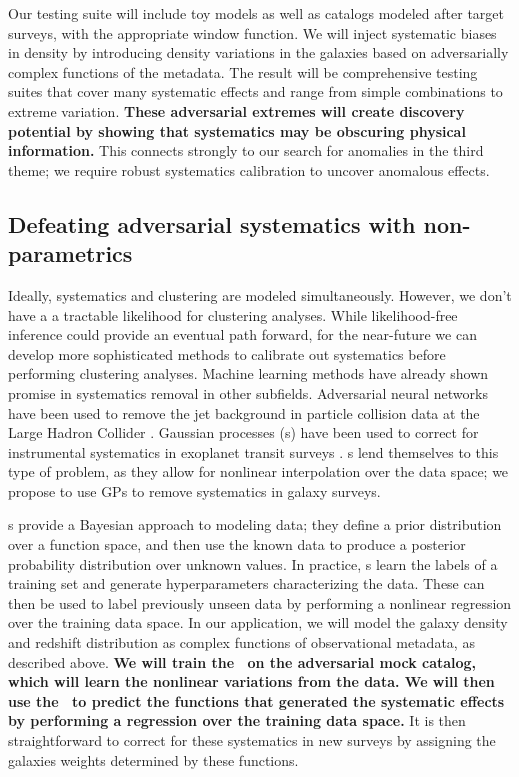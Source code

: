 \documentclass[12pt, fullpage, letterpaper]{article}
\begin{document}
Our testing suite will include toy models as well as catalogs modeled after target surveys, with the appropriate window function.
We will inject systematic biases in density by introducing density variations in the galaxies based on adversarially complex functions of the metadata.
The result will be comprehensive testing suites that cover many systematic effects and range from simple combinations to extreme variation.
\textbf{These adversarial extremes will create discovery potential by showing that systematics may be obscuring physical information.}
This connects strongly to our search for anomalies in the third theme; we require robust systematics calibration to uncover anomalous effects.

\subsection{Defeating adversarial systematics with non-parametrics}

Ideally, systematics and clustering are modeled simultaneously. 
However, we don't have a a tractable likelihood for clustering analyses.
While likelihood-free inference could provide an eventual path forward, for the near-future we can develop more sophisticated methods to calibrate out systematics before performing clustering analyses.
Machine learning methods have already shown promise in systematics removal in other subfields.
Adversarial neural networks have been used to remove the jet background in particle collision data at the Large Hadron Collider \citep{Shimmin2017}.
Gaussian processes (\GP s) have been used to correct for instrumental systematics in exoplanet transit surveys \citep{Gibson2012, Aigrain2016}. 
\GP s lend themselves to this type of problem, as they allow for nonlinear interpolation over the data space; we propose to use GPs to remove systematics in galaxy surveys.

\GP s provide a Bayesian approach to modeling data; they define a prior distribution over a function space, and then use the known data to produce a posterior probability distribution over unknown values. 
In practice, \GP s learn the labels of a training set and generate hyperparameters characterizing the data.
These can then be used to label previously unseen data by performing a nonlinear regression over the training data space.
In our application, we will model the galaxy density and redshift distribution as complex functions of observational metadata, as described above.
\textbf{We will train the \GP\ on the adversarial mock catalog, which will learn the nonlinear variations from the data.
We will then use the \GP\ to predict the functions that generated the systematic effects by performing a regression over the training data space.}
It is then straightforward to correct for these systematics in new surveys by assigning the galaxies weights determined by these functions.
\end{document}
